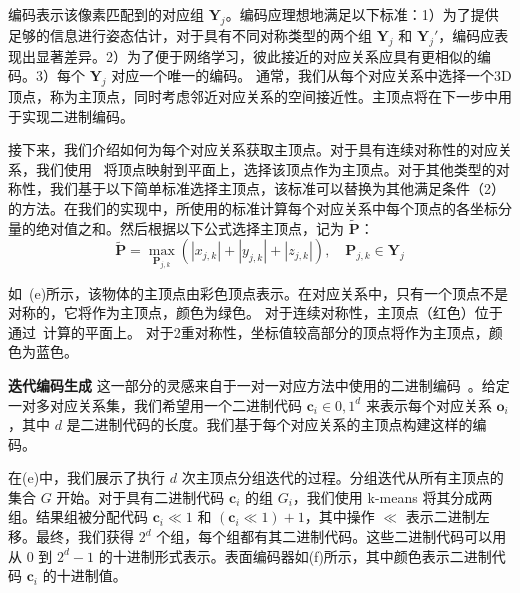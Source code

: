 编码表示该像素匹配到的对应组 $\mathbf{Y}_j$。编码应理想地满足以下标准：1）为了提供足够的信息进行姿态估计，对于具有不同对称类型的两个组 $\mathbf{Y}_j$ 和 $\mathbf{Y}_j'$，编码应表现出显著差异。2）为了便于网络学习，彼此接近的对应关系应具有更相似的编码。3）每个 $\mathbf{Y}_j$ 对应一个唯一的编码。
通常，我们从每个对应关系中选择一个3D顶点，称为主顶点，同时考虑邻近对应关系的空间接近性。主顶点将在下一步中用于实现二进制编码。

接下来，我们介绍如何为每个对应关系获取主顶点。对于具有连续对称性的对应关系，我们使用~ 将顶点映射到平面上，选择该顶点作为主顶点。对于其他类型的对称性，我们基于以下简单标准选择主顶点，该标准可以替换为其他满足条件（2）的方法。在我们的实现中，所使用的标准计算每个对应关系中每个顶点的各坐标分量的绝对值之和。然后根据以下公式选择主顶点，记为 $\tilde{\mathbf{P}}$：
\begin{equation}
    \tilde{\mathbf{P}} = \max_{\mathbf{P}_{j,k}}
    (\left | x_{j,k} \right | +\left | y_{j,k} \right | +\left | z_{j,k} \right |), \quad \mathbf{P}_{j,k} \in \mathbf{Y}_j
\end{equation}

如~(e)所示，该物体的主顶点由彩色顶点表示。在对应关系中，只有一个顶点不是对称的，它将作为主顶点，颜色为绿色。
对于连续对称性，主顶点（红色）位于通过~计算的平面上。
对于2重对称性，坐标值较高部分的顶点将作为主顶点，颜色为蓝色。

\textbf{迭代编码生成 } 这一部分的灵感来自于一对一对应方法中使用的二进制编码~\cite{su2022zebrapose}。给定一对多对应关系集，我们希望用一个二进制代码 $\mathbf{c}_i \in {0, 1}^d$ 来表示每个对应关系 $\mathbf{o}_i$，其中 $d$ 是二进制代码的长度。我们基于每个对应关系的主顶点构建这样的编码。

在(e)中，我们展示了执行 $d$ 次主顶点分组迭代的过程。分组迭代从所有主顶点的集合 $G$ 开始。对于具有二进制代码 $\mathbf{c}_i$ 的组 $G_{i}$，我们使用 k-means 将其分成两组。结果组被分配代码 $\mathbf{c}_i \ll 1$ 和 $(\mathbf{c}_i \ll 1) + 1$，其中操作 $\ll$ 表示二进制左移。最终，我们获得 $2^d$ 个组，每个组都有其二进制代码。这些二进制代码可以用从 $0$ 到 $2^d - 1$ 的十进制形式表示。表面编码器如(f)所示，其中颜色表示二进制代码 $\mathbf{c}_i$ 的十进制值。

